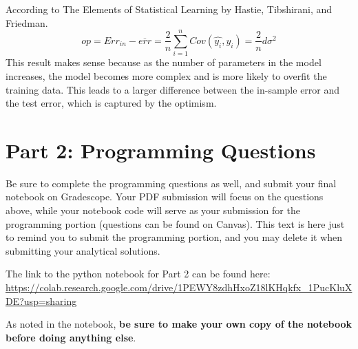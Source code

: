 \documentclass[11pt,addpoints,answers]{exam}
\begin{document}
\begin{questions}
\begin{parts}
  \begin{solutionorbox}[5in]
    According to The Elements of Statistical Learning by Hastie, Tibshirani, and Friedman.
    \[ op = Err_{in} - \overline{err} = \frac{2}{n}\sum_{i=1}^{n}Cov(\hat{y_i}, y_i) = \frac{2}{n}d\sigma^2 \]
    This result makes sense because as the number of parameters in the model increases, the model becomes more complex and is more likely to overfit the training data. This leads to a larger difference between the in-sample error and the test error, which is captured by the optimism.
  \end{solutionorbox}
  \end{parts}

\end{questions}

\newpage
\section*{Part 2: Programming Questions}

Be sure to complete the programming questions as well, and submit your final notebook on Gradescope.  Your PDF submission will focus on the questions above, while your notebook code will serve as your submission for the programming portion (questions can be found on Canvas).  This text is here just to remind you to submit the programming portion, and you may delete it when submitting your analytical solutions.

The link to the python notebook for Part 2 can be found here: \url{https://colab.research.google.com/drive/1PEWY8zdhHxoZ18lKHqkfx_1PucKluXDE?usp=sharing}

As noted in the notebook, \textbf{be sure to make your own copy of the notebook before doing anything else}.
\end{document}
